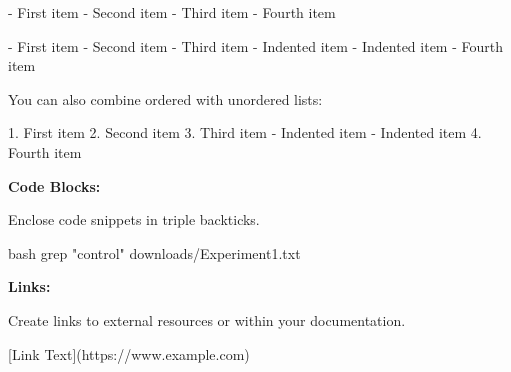 \documentclass[
  letterpaper,
  DIV=11,
  numbers=noendperiod]{scrreprt}
\newenvironment{Shaded}{}{}
\newcommand{\CommentTok}[1]{\textcolor[rgb]{0.42,0.45,0.49}{#1}}
\newcommand{\FunctionTok}[1]{\textcolor[rgb]{0.44,0.26,0.76}{#1}}
\newcommand{\InformationTok}[1]{\textcolor[rgb]{0.42,0.45,0.49}{#1}}
\newcommand{\NormalTok}[1]{\textcolor[rgb]{0.14,0.16,0.18}{#1}}
\newcommand{\OtherTok}[1]{\textcolor[rgb]{0.44,0.26,0.76}{#1}}
\newcommand{\SpecialStringTok}[1]{\textcolor[rgb]{0.01,0.18,0.38}{#1}}
\newcommand{\StringTok}[1]{\textcolor[rgb]{0.01,0.18,0.38}{#1}}
\begin{document}
\begin{Shaded}
\begin{Highlighting}[]
\SpecialStringTok{{-} }\NormalTok{First item}
\SpecialStringTok{{-} }\NormalTok{Second item}
\SpecialStringTok{{-} }\NormalTok{Third item}
\SpecialStringTok{{-} }\NormalTok{Fourth item }
\end{Highlighting}
\end{Shaded}

\begin{Shaded}
\begin{Highlighting}[]
\SpecialStringTok{ {-} }\NormalTok{First item}
\SpecialStringTok{{-} }\NormalTok{Second item}
\SpecialStringTok{{-} }\NormalTok{Third item}
\SpecialStringTok{    {-} }\NormalTok{Indented item}
\SpecialStringTok{    {-} }\NormalTok{Indented item}
\SpecialStringTok{{-} }\NormalTok{Fourth item }
\end{Highlighting}
\end{Shaded}

You can also combine ordered with unordered lists:

\begin{Shaded}
\begin{Highlighting}[]
\SpecialStringTok{1. }\NormalTok{First item}
\SpecialStringTok{2. }\NormalTok{Second item}
\SpecialStringTok{3. }\NormalTok{Third item}
\SpecialStringTok{    {-} }\NormalTok{Indented item}
\SpecialStringTok{    {-} }\NormalTok{Indented item}
\SpecialStringTok{4. }\NormalTok{Fourth item}
\end{Highlighting}
\end{Shaded}

\textbf{Code Blocks:}

Enclose code snippets in triple backticks.

\begin{Shaded}
\begin{Highlighting}[]
\InformationTok{\textasciigrave{}\textasciigrave{}\textasciigrave{}bash}
\FunctionTok{grep} \StringTok{"control"}\NormalTok{ downloads/Experiment1.txt}
\InformationTok{\textasciigrave{}\textasciigrave{}\textasciigrave{}}
\end{Highlighting}
\end{Shaded}

\textbf{Links:}

Create links to external resources or within your documentation.

\begin{Shaded}
\begin{Highlighting}[]
\CommentTok{[}\OtherTok{Link Text}\CommentTok{](https://www.example.com)}
\end{Highlighting}
\end{Shaded}
\end{document}
